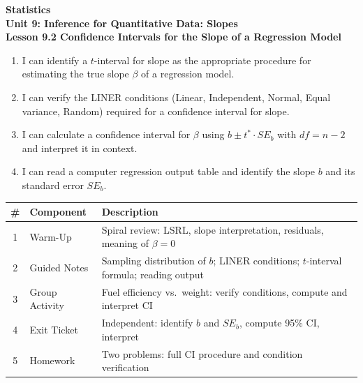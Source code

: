 \documentclass[10pt]{article}
\begin{document}
\vspace{-0.8in}

\begin{center}
  {\color{white}\textbf{\LARGE Statistics}}\\[4pt]
  {\color{skymid}\large\textbf{Unit 9: Inference for Quantitative Data: Slopes}}\\[6pt]
  {\color{white}\textbf{\large Lesson 9.2 \quad Confidence Intervals for the Slope of a Regression Model}}
\end{center}

\vspace{0.22in}
\namedateperiod
\vspace{0.18in}

\begin{learningtargetbox}
\small
\begin{enumerate}[leftmargin=1.5em, itemsep=5pt]
  \item I can identify a $t$-interval for slope as the appropriate procedure for
        estimating the true slope $\beta$ of a regression model.
  \item I can verify the LINER conditions (Linear, Independent, Normal, Equal variance,
        Random) required for a confidence interval for slope.
  \item I can calculate a confidence interval for $\beta$ using $b \pm t^* \cdot SE_b$
        with $df = n-2$ and interpret it in context.
  \item I can read a computer regression output table and identify the slope $b$ and
        its standard error $SE_b$.
\end{enumerate}
\end{learningtargetbox}

\vspace{0.14in}

\begin{tocbox}
\small
\renewcommand{\arraystretch}{1.5}
\begin{tabularx}{\linewidth}{@{} c l X @{}}
\rowcolor{sky}
\textbf{\#} & \textbf{Component} & \textbf{Description} \\
\midrule
1 & Warm-Up        & Spiral review: LSRL, slope interpretation, residuals, meaning of $\beta=0$ \\
2 & Guided Notes   & Sampling distribution of $b$; LINER conditions; $t$-interval formula; reading output \\
3 & Group Activity & Fuel efficiency vs.\ weight: verify conditions, compute and interpret CI \\
4 & Exit Ticket    & Independent: identify $b$ and $SE_b$, compute 95\% CI, interpret \\
5 & Homework       & Two problems: full CI procedure and condition verification \\
\end{tabularx}
\end{tocbox}
\end{document}

